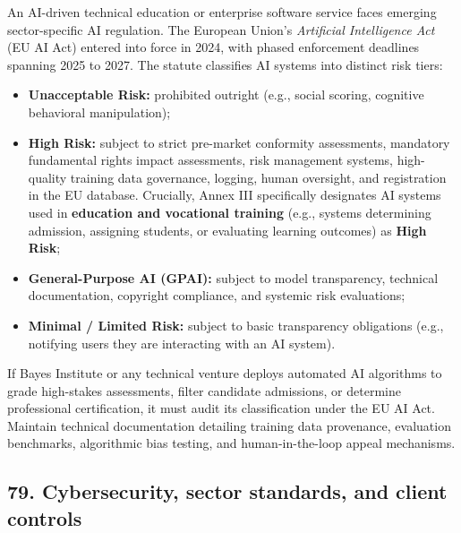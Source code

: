 An AI-driven technical education or enterprise software service faces emerging sector-specific AI regulation. The European Union's \textit{Artificial Intelligence Act} (EU AI Act) entered into force in 2024, with phased enforcement deadlines spanning 2025 to 2027. The statute classifies AI systems into distinct risk tiers:
\begin{itemize}
    \item \textbf{Unacceptable Risk:} prohibited outright (e.g., social scoring, cognitive behavioral manipulation);
    \item \textbf{High Risk:} subject to strict pre-market conformity assessments, mandatory fundamental rights impact assessments, risk management systems, high-quality training data governance, logging, human oversight, and registration in the EU database. Crucially, Annex III specifically designates AI systems used in \textbf{education and vocational training} (e.g., systems determining admission, assigning students, or evaluating learning outcomes) as \textbf{High Risk};
    \item \textbf{General-Purpose AI (GPAI):} subject to model transparency, technical documentation, copyright compliance, and systemic risk evaluations;
    \item \textbf{Minimal / Limited Risk:} subject to basic transparency obligations (e.g., notifying users they are interacting with an AI system).
\end{itemize}

If Bayes Institute or any technical venture deploys automated AI algorithms to grade high-stakes assessments, filter candidate admissions, or determine professional certification, it must audit its classification under the EU AI Act. Maintain technical documentation detailing training data provenance, evaluation benchmarks, algorithmic bias testing, and human-in-the-loop appeal mechanisms.

\subsection{79. Cybersecurity, sector standards, and client controls}

